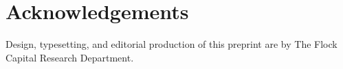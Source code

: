 \documentclass[10pt]{article}
\begin{document}








\section*{Acknowledgements}
Design, typesetting, and editorial production of this preprint are by
The Flock Capital Research Department.

\printbibliography

\wugaru{24pt}
\end{document}
